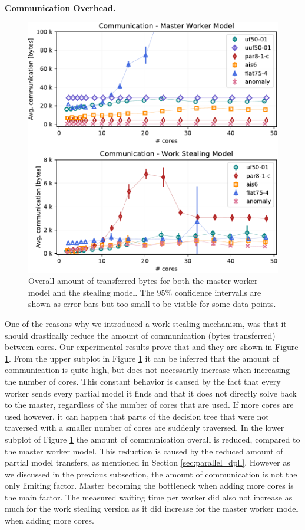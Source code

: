 \documentclass[letterpaper]{article}
\newcommand{\mypar}[1]{{\bf #1.}}
\begin{document}
\mypar{Communication Overhead}
\begin{figure}[p]
    \centering
    \includegraphics[width=\columnwidth]{figures/comm_subset_dpll_scaling_tar.pdf}
    \caption{Overall amount of transferred bytes for both the master worker model and the stealing model.
    The 95\% confidence intervalls are shown as error bars but too small to be visible for some data points.}
    \label{fig:comm_reduce}
\end{figure}
One of the reasons why we introduced a work stealing mechanism,
was that it should drastically reduce the amount of communication (bytes transferred) between cores.
Our experimental results prove that and they are shown in Figure \ref{fig:comm_reduce}.
From the upper subplot in Figure \ref{fig:comm_reduce} it can be inferred that the amount of communication is quite high,
but does not necessarily increase when increasing the number of cores.
This constant behavior is caused by the fact that every worker sends every partial model it finds and that it does not directly solve back to the master,
regardless of the number of cores that are used.
If more cores are used however, it can happen that parts of the decision tree that were not traversed with a smaller number of cores are suddenly traversed.
In the lower subplot of Figure \ref{fig:comm_reduce} the amount of communication overall is reduced, compared to the master worker model.
This reduction is caused by the reduced amount of partial model transfers, as mentioned in Section \ref{sec:parallel_dpll}.
However as we discussed in the previous subsection, the amount of communication is not the only limiting factor.
Master becoming the bottleneck when adding more cores is the main factor.
The measured waiting time per worker did also not increase as much for the work stealing version as it did increase for the master worker model when adding more cores.
\end{document}
